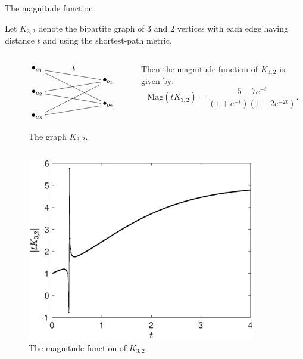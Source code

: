 \documentclass[12pt]{beamer}
\begin{document}
\begin{frame}[allowframebreaks]{The magnitude function}
\framebreak

\begin{example}
Let $K_{3,2}$ denote the bipartite graph of 3 and 2 vertices with each edge having distance $t$ and using the shortest-path metric.
\begin{columns}
\begin{column}{0.45\textwidth}
\begin{figure}
\begin{equation*}
\begin{xy}
(0,0)*+{\bullet_{a_1}}="a1";
(0,-10)*+{\bullet_{a_2}}="a2";
(0,-20)*+{\bullet_{a_3}}="a3";
(30,-5)*+{\bullet_{b_1}}="b1";
(30,-15)*+{\bullet_{b_2}}="b2";
{\ar@{-} "a1";"b1"}?*!/_3mm/{t};
{\ar@{-} "a2";"b1"};
{\ar@{-} "a3";"b1"};
{\ar@{-} "a1";"b2"};
{\ar@{-} "a2";"b2"};
{\ar@{-} "a3";"b2"};
\end{xy}
\end{equation*}
\caption{\label{fig:K32}The graph $K_{3,2}$.}
\end{figure}
\end{column}
\begin{column}{0.50\textwidth}
Then the magnitude function of $K_{3,2}$ is given by:
\begin{equation*}
\text{Mag}\left(tK_{3,2}\right) = \frac{5-7e^{-t}}{(1+e^{-t})(1-2e^{-2t})}.
\end{equation*}
\end{column}
\end{columns}
\end{example}
\end{frame}

\begin{frame}[plain]
\begin{figure}
\includegraphics[width=10cm]{K32.eps}\caption{\label{fig:K32magfun}The magnitude function of $K_{3,2}$.}
\end{figure}
\end{frame}
\end{document}
